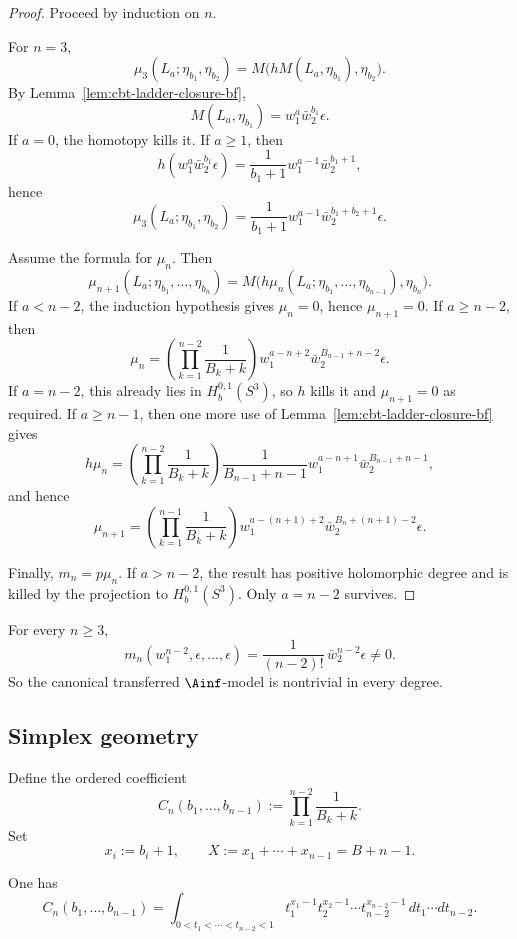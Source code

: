 \begin{proof}
Proceed by induction on $n$.

For $n=3$,
\[
\mu_3(L_a;\eta_{b_1},\eta_{b_2})
=
M\bigl(hM(L_a,\eta_{b_1}),\eta_{b_2}\bigr).
\]
By Lemma~\ref{lem:cbt-ladder-closure-bf},
\[
M(L_a,\eta_{b_1})=w_1^a\bar w_2^{b_1}\epsilon.
\]
If $a=0$, the homotopy kills it. If $a\ge1$, then
\[
h(w_1^a\bar w_2^{b_1}\epsilon)
=
\frac{1}{b_1+1}w_1^{a-1}\bar w_2^{b_1+1},
\]
hence
\[
\mu_3(L_a;\eta_{b_1},\eta_{b_2})
=
\frac{1}{b_1+1}w_1^{a-1}\bar w_2^{b_1+b_2+1}\epsilon.
\]

Assume the formula for $\mu_n$. Then
\[
\mu_{n+1}(L_a;\eta_{b_1},\dots,\eta_{b_n})
=
M\bigl(h\mu_n(L_a;\eta_{b_1},\dots,\eta_{b_{n-1}}),\eta_{b_n}\bigr).
\]
If $a<n-2$, the induction hypothesis gives $\mu_n=0$, hence $\mu_{n+1}=0$. If $a\ge n-2$, then
\[
\mu_n=
\left(\prod_{k=1}^{n-2}\frac{1}{B_k+k}\right)
w_1^{a-n+2}\bar w_2^{B_{n-1}+n-2}\epsilon.
\]
If $a=n-2$, this already lies in $H_b^{0,1}(S^3)$, so $h$ kills it and $\mu_{n+1}=0$ as required. If $a\ge n-1$, then one more use of Lemma~\ref{lem:cbt-ladder-closure-bf} gives
\[
h\mu_n=
\left(\prod_{k=1}^{n-2}\frac{1}{B_k+k}\right)
\frac{1}{B_{n-1}+n-1}
w_1^{a-n+1}\bar w_2^{B_{n-1}+n-1},
\]
and hence
\[
\mu_{n+1}=
\left(\prod_{k=1}^{n-1}\frac{1}{B_k+k}\right)
w_1^{a-(n+1)+2}\bar w_2^{B_n+(n+1)-2}\epsilon.
\]

Finally, $m_n=p\mu_n$. If $a>n-2$, the result has positive holomorphic degree and is killed by the projection to $H_b^{0,1}(S^3)$. Only $a=n-2$ survives.
\end{proof}

\begin{corollary}
For every $n\ge3$,
\[
m_n(w_1^{n-2},\epsilon,\dots,\epsilon)
=
\frac{1}{(n-2)!}\,\bar w_2^{n-2}\epsilon\neq0.
\]
So the canonical transferred $\Ainf$-model is nontrivial in every degree.
\end{corollary}

\subsection{Simplex geometry}

Define the ordered coefficient
\[
C_n(b_1,\dots,b_{n-1})
:=
\prod_{k=1}^{n-2}\frac{1}{B_k+k}.
\]
Set
\[
x_i:=b_i+1,
\qquad
X:=x_1+\cdots+x_{n-1}=B+n-1.
\]

\begin{proposition}
One has
\[
C_n(b_1,\dots,b_{n-1})
=
\int_{0<t_1<\cdots<t_{n-2}<1}
t_1^{x_1-1}t_2^{x_2-1}\cdots t_{n-2}^{x_{n-2}-1}\,
dt_1\cdots dt_{n-2}.
\]
\end{proposition}

